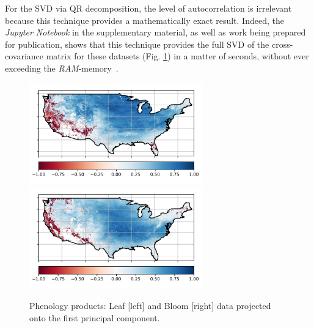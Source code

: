 \documentclass[ijgi,article,submit,moreauthors,pdftex,10pt,a4paper]{Definitions/mdpi}
\begin{document}
For the SVD via QR decomposition, the level of autocorrelation is irrelevant because this technique provides a mathematically exact result. Indeed, the \textit{Jupyter Notebook} in the supplementary material, as well as work being prepared for publication, shows that this technique provides the full SVD of the cross-covariance matrix for these datasets (Fig. \ref{fig:maps}) in a matter of seconds, without ever exceeding the \textit{RAM}-memory~\cite{Bogaardt2018, ZuritaMilla2018}.
\begin{figure}[H]
\centering
\includegraphics[width=7.5cm]{Results/SpatialModeV01Grid.pdf} ~~~~~ \includegraphics[width=7.5cm]{Results/SpatialModeU01Grid.pdf}
\caption{Phenology products: Leaf [left] and Bloom [right] data projected onto the first principal component.}
\label{fig:maps}
\end{figure}


\end{document}
